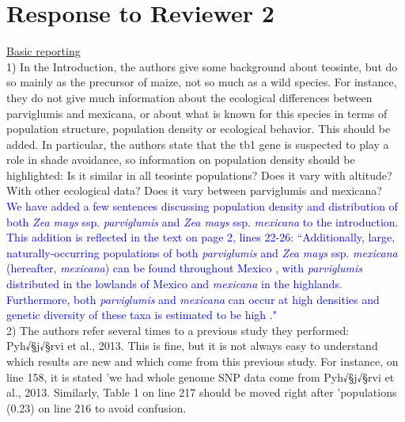 \documentclass[11pt]{article}
\newcommand{\res}[1]{\noindent \textcolor{blue}{{#1}} \\}
\begin{document}
\section*{Response to Reviewer 2} 

\underline{Basic reporting}\\

1) In the Introduction, the authors give some background about teosinte, but do so mainly as the precursor of maize, not so much as a wild species. For instance, they do not give much information about the ecological differences between parviglumis and mexicana, or about what is known for this species in terms of population structure, population density or ecological behavior. This should be added. In particular, the authors state that the tb1 gene is suspected to play a role in shade avoidance, so information on population density should be highlighted: Is it similar in all teosinte populations? Does it vary with altitude? With other ecological data? Does it vary between parviglumis and mexicana?\\

\res{We have added a few sentences discussing population density and distribution of both \emph{Zea mays} ssp. \emph{parviglumis} and \emph{Zea mays} ssp. \emph{mexicana} to the introduction. This addition is reflected in the text on page 2, lines 22-26: ``Additionally, large, naturally-occurring populations of both \emph{parviglumis} and \emph{Zea mays} ssp. \emph{mexicana} (hereafter, \emph{mexicana}) can be found throughout Mexico \citep{Wilkes1977, Hufford2013}, with \emph{parviglumis} distributed in the lowlands of Mexico and \emph{mexicana} in the highlands. Furthermore, both \emph{parviglumis} and \emph{mexicana} can occur at high densities and genetic diversity of these taxa is estimated to be high \citep{Hufford2012a, Ross-Ibarra2009}."}

2) The authors refer several times to a previous study they performed: Pyh√§j√§rvi et al., 2013. This is fine, but it is not always easy to understand which results are new and which come from this previous study. For instance, on line 158, it is stated 'we had whole genome SNP data come from Pyh√§j√§rvi et al., 2013. Similarly, Table 1 on line 217 should be moved right after 'populations (0.23) on line 216 to avoid confusion.\\
\end{document}
